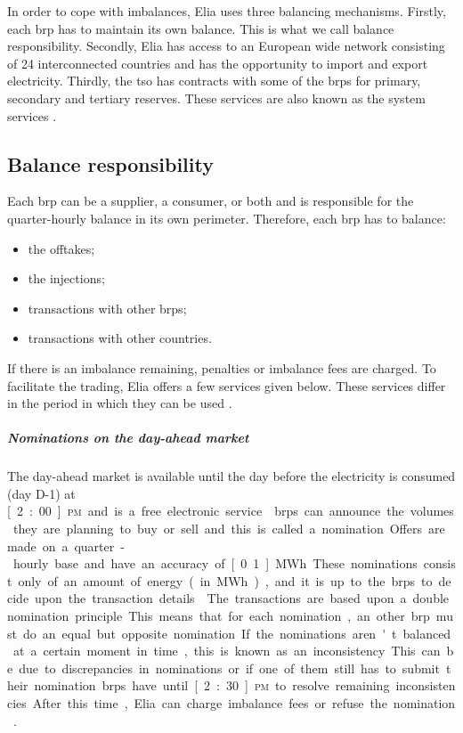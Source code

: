 In order to cope with imbalances, Elia uses three balancing mechanisms. Firstly, each \gls{brp} has to maintain its own balance. This is what we call balance responsibility. Secondly, Elia has access to an European wide network consisting of 24 interconnected countries and has the opportunity to import and export electricity. Thirdly, the \gls{tso} has contracts with some of the \glspl{brp} for primary, secondary and tertiary reserves. These services are also known as the system services \cite{EliaProd,EliaRO,EliaBM}.

\subsection{Balance responsibility}
\label{ss:balanceresponsibility}

Each \gls{brp} can be a supplier, a consumer, or both and is responsible for the quarter-hourly balance in its own perimeter. Therefore, each \gls{brp} has to balance:
\begin{itemize}
\item the offtakes;
\item the injections;
\item transactions with other \glspl{brp};
\item transactions with other countries.
\end{itemize}
If there is an imbalance remaining, penalties or imbalance fees are charged. To facilitate the trading, Elia offers a few services given below. These services differ in the period in which they can be used \cite{EliaProd,EliaRO}.

\subparagraph{Nominations on the day-ahead market}

The day-ahead market is available until the day before the electricity is consumed (day D-1) at \unit[2:00]{\textsc{pm}}  and is a free electronic service \cite{EliaN}. \glspl{brp} can announce the volumes they are planning to buy or sell and this is called a nomination. Offers are made on a quarter-hourly base and have an accuracy of \unit[0.1]{MWh}. These nominations consist only of an amount of energy (in \unit{MWh}), and it is up to the \glspl{brp} to decide upon the transaction details \cite{EliaDA,EliaN}. 

The transactions are based upon a double nomination principle. This means that for each nomination, an other \gls{brp} must do an equal but opposite nomination. If the nominations aren't balanced at a certain moment in time, this is known as an inconsistency. This can be due to discrepancies in nominations or if one of them still has to submit their nomination. \glspl{brp} have until \unit[2:30]{\textsc{pm}} to resolve remaining inconsistencies. After this time, Elia can charge imbalance fees or refuse the nomination \cite{EliaDA,EliaN}.

